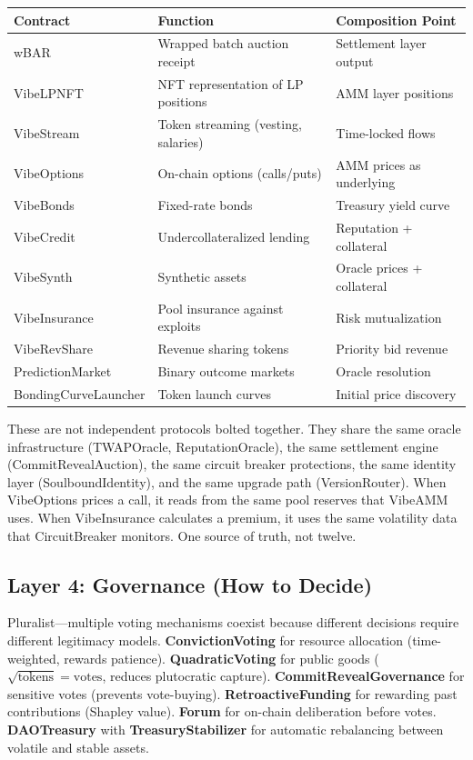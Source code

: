 \documentclass[9pt, letterpaper]{article}
\begin{document}
\vspace{0.1em}
{\small
\renewcommand{\arraystretch}{1.05}
\begin{tabularx}{\textwidth}{@{} l l X @{}}
\toprule
\textbf{Contract} & \textbf{Function} & \textbf{Composition Point} \\
\midrule
wBAR & Wrapped batch auction receipt & Settlement layer output \\
VibeLPNFT & NFT representation of LP positions & AMM layer positions \\
VibeStream & Token streaming (vesting, salaries) & Time-locked flows \\
VibeOptions & On-chain options (calls/puts) & AMM prices as underlying \\
VibeBonds & Fixed-rate bonds & Treasury yield curve \\
VibeCredit & Undercollateralized lending & Reputation + collateral \\
VibeSynth & Synthetic assets & Oracle prices + collateral \\
VibeInsurance & Pool insurance against exploits & Risk mutualization \\
VibeRevShare & Revenue sharing tokens & Priority bid revenue \\
PredictionMarket & Binary outcome markets & Oracle resolution \\
BondingCurveLauncher & Token launch curves & Initial price discovery \\
\bottomrule
\end{tabularx}
}

\vspace{0.2em}
These are not independent protocols bolted together. They share the same oracle infrastructure (TWAPOracle, ReputationOracle), the same settlement engine (CommitRevealAuction), the same circuit breaker protections, the same identity layer (SoulboundIdentity), and the same upgrade path (VersionRouter). When VibeOptions prices a call, it reads from the same pool reserves that VibeAMM uses. When VibeInsurance calculates a premium, it uses the same volatility data that CircuitBreaker monitors. One source of truth, not twelve.

\subsection{Layer 4: Governance (How to Decide)}

Pluralist---multiple voting mechanisms coexist because different decisions require different legitimacy models. \textbf{ConvictionVoting} for resource allocation (time-weighted, rewards patience). \textbf{QuadraticVoting} for public goods ($\sqrt{\text{tokens}} = \text{votes}$, reduces plutocratic capture). \textbf{CommitRevealGovernance} for sensitive votes (prevents vote-buying). \textbf{RetroactiveFunding} for rewarding past contributions (Shapley value). \textbf{Forum} for on-chain deliberation before votes. \textbf{DAOTreasury} with \textbf{TreasuryStabilizer} for automatic rebalancing between volatile and stable assets.
\end{document}

